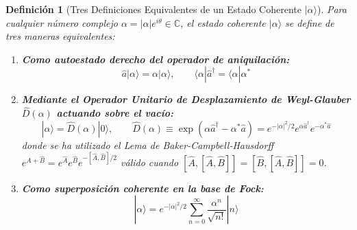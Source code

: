 \documentclass[11pt,a4paper]{book}
\newtheorem{definicion}{Definición}[chapter]
\begin{document}
\begin{definicion}[Tres Definiciones Equivalentes de un Estado Coherente $|\alpha\rangle$]
Para cualquier número complejo $\alpha = |\alpha|e^{i\theta} \in \mathbb{C}$, el estado coherente $|\alpha\rangle$ se define de tres maneras equivalentes:
\begin{enumerate}
    \item \textbf{Como autoestado derecho del operador de aniquilación:}
    \begin{equation}
    \hat{a}|\alpha\rangle = \alpha|\alpha\rangle, \qquad \langle \alpha | \hat{a}^\dagger = \langle \alpha | \alpha^*
    \end{equation}
    \item \textbf{Mediante el Operador Unitario de Desplazamiento de Weyl-Glauber $\hat{D}(\alpha)$ actuando sobre el vacío:}
    \begin{equation}
    |\alpha\rangle = \hat{D}(\alpha)|0\rangle, \qquad \hat{D}(\alpha) \equiv \exp\left(\alpha \hat{a}^\dagger - \alpha^* \hat{a}\right) = e^{-|\alpha|^2/2} e^{\alpha \hat{a}^\dagger} e^{-\alpha^* \hat{a}}
    \end{equation}
    donde se ha utilizado el Lema de Baker-Campbell-Hausdorff $e^{\hat{A}+\hat{B}} = e^{\hat{A}}e^{\hat{B}}e^{-[\hat{A},\hat{B}]/2}$ válido cuando $[\hat{A}, [\hat{A},\hat{B}]] = [\hat{B}, [\hat{A},\hat{B}]] = 0$.
    \item \textbf{Como superposición coherente en la base de Fock:}
    \begin{equation}
    |\alpha\rangle = e^{-|\alpha|^2/2} \sum_{n=0}^{\infty} \frac{\alpha^n}{\sqrt{n!}} |n\rangle
    \end{equation}
\end{enumerate}
\end{definicion}
\end{document}
